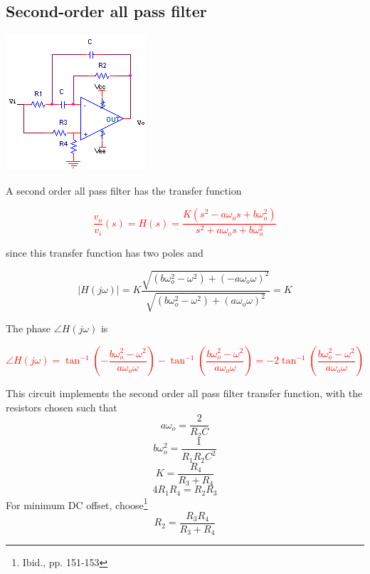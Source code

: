\subsection{Second-order all pass filter}
\begin{center}
	\includegraphics{schematics/2ndorder_allpass.PNG}
\end{center}
A second order all pass filter has the transfer function

\textcolor{red}{
\begin{equation}
\frac{v_{o}}{v_{i}}(s) = H(s) = \frac{K(s^{2} - a\omega_{o}s + b\omega_{o}^{2})}{s^{2} + a\omega_{o}s + b\omega_{o}^{2}}
\label{eq:2ndorder_allpass}
\end{equation}
}

since this transfer function has two poles and

\begin{equation}
|H(j\omega)| = K\frac{\sqrt{(b\omega_{o}^{2}-\omega^{2}) + (-a\omega_{o}\omega)^{2}}}{\sqrt{(b\omega_{o}^{2}-\omega^{2}) + (a\omega_{o}\omega)^{2}}} = K
\end{equation}

The phase $\angle H(j\omega)$ is

\textcolor{red}{
\begin{equation}
\angle H(j\omega) = \tan^{-1}\left(-\frac{b\omega_{o}^{2}-\omega^{2}}{a\omega_{o}\omega}\right) - \tan^{-1}\left(\frac{b\omega_{o}^{2}-\omega^{2}}{a\omega_{o}\omega}\right) = -2\tan^{-1}\left(\frac{b\omega_{o}^{2}-\omega^{2}}{a\omega_{o}\omega}\right)
\label{eq:2ndorder_allpass_angle}
\end{equation}
}

This circuit implements the second order all pass filter transfer function, with the resistors chosen such that
\begin{equation}
a\omega_{o} = \frac{2}{R_{2}C}
\end{equation}
\begin{equation}
b\omega_{o}^{2} = \frac{1}{R_{1}R_{2}C^{2}}
\end{equation}
\begin{equation}
K = \frac{R_{4}}{R_{3}+R_{4}}
\end{equation}
\begin{equation}
4R_{1}R_{4} = R_{2}R_{3}
\end{equation}
For minimum DC offset, choose\footnote{Ibid., pp. 151-153}
\begin{equation}
R_{2} = \frac{R_{3}R_{4}}{R_{3}+R_{4}}
\end{equation}
